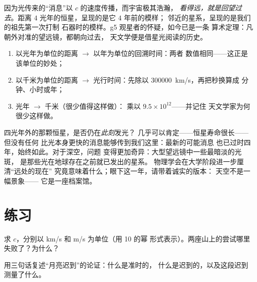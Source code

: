 \begin{proposition}[望远镜是时光机器]\label{prop:g8:speed-of-light:timemachine}
因为光传来的“消息”以 $c$ 的速度传播，而宇宙极其浩瀚，
\emph{看得远，就是回望过去}。距离 $4$
光年的恒星，呈现的是它 $4$ 年前的模样；
邻近的星系，呈现的是我们的祖先第一次打制
石器时的模样。g5 观星者的怀疑，如今已是一条
算术定理：凡朝外对准的望远镜，都朝向过去，
天文学便是借星光阅读的历史。
\end{proposition}

\begin{method}[距离与回溯时间的换算]\label{met:g8:speed-of-light:convert}
\begin{enumerate}
  \item 以光年为单位的距离 $\to$ 以年为单位的回溯时间：两者
        数值相同——这正是该单位的妙处；
  \item 以千米为单位的距离 $\to$ 光行时间：先除以
        \qty{300000}{km/s}，再把秒换算成
        分钟、小时或年；
  \item 光年 $\to$ 千米（很少值得这样做）：
        乘以 $9.5 \times 10^{12}$——并记住
        天文学家为何很少这样做。
\end{enumerate}
\end{method}

\begin{remark}\label{rem:g8:speed-of-light:now}
四光年外的那颗恒星，是否仍在\emph{此刻}发光？
几乎可以肯定——恒星寿命很长——但没有任何
比光本身更快的消息能够传到我们这里：最新的可能消息
也已过时四年，始终如此。对于深空，问题
变得更加奇异：大型望远镜中一些最暗淡的光斑，
是那些光在地球存在之前就已发出的星系。
物理学会在大学阶段进一步厘清“远处的现在”
究竟意味着什么；眼下这一年，请带着诚实的版本：
天空不是一幅景象——
它是一座档案馆。
\end{remark}

\section{练习}

\begin{exercise}[$\star$]\label{exo:g8:speed-of-light:1}
求 $c$，分别以 \unit{km/s} 和 \unit{m/s} 为单位（用 10 的幂
形式表示）。两座山上的尝试哪里失败了？为什么？
\end{exercise}

\begin{exercise}[$\star$]\label{exo:g8:speed-of-light:2}
用三句话复述“月亮迟到”的论证：什么是准时的，
什么是迟到的，以及这段迟到测量了什么。
\end{exercise}

